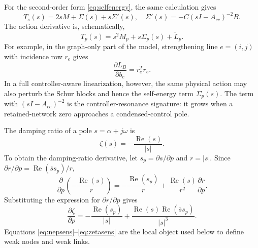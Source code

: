 \documentclass[conference]{IEEEtran}
\newcommand{\Real}{\operatorname{Re}}
\begin{document}
For the second-order form \eqref{eq:selfenergy}, the same calculation gives
\begin{equation}
  T_s(s)=2sM+\Sigma(s)+s\Sigma'(s),\quad
  \Sigma'(s)=-C(sI-A_{cc})^{-2}B .
  \label{eq:ts}
\end{equation}
The action derivative is, schematically,
\begin{equation}
  T_p(s)=s^2M_p+s\Sigma_p(s)+\widetilde L_p .
  \label{eq:tp_general}
\end{equation}
For example, in the graph-only part of the model, strengthening line
$e=(i,j)$ with incidence row $r_e$ gives
\begin{equation}
  \frac{\partial L_B}{\partial b_e}=r_e^Tr_e .
  \label{eq:line_derivative_tutorial}
\end{equation}
In a full controller-aware linearization, however, the same physical action may
also perturb the Schur blocks and hence the self-energy term $\Sigma_p(s)$.
The term with $(sI-A_{cc})^{-2}$ is the controller-resonance signature: it grows when a retained-network zero approaches a condensed-control pole.

The damping ratio of a pole $s=\alpha+j\omega$ is
\begin{equation}
  \zeta(s)=-\frac{\Real(s)}{|s|}.
  \label{eq:zeta}
\end{equation}
To obtain the damping-ratio derivative, let $s_p=\partial s/\partial p$ and
$r=|s|$. Since $\partial r/\partial p=\Real(\overline{s}s_p)/r$,
\begin{equation}
  \frac{\partial}{\partial p}\left(-\frac{\Real(s)}{r}\right)
  =
  -\frac{\Real(s_p)}{r}
  +\frac{\Real(s)}{r^2}\frac{\partial r}{\partial p}.
  \label{eq:zeta_chain}
\end{equation}
Substituting the expression for $\partial r/\partial p$ gives
\begin{equation}
  \frac{\partial\zeta}{\partial p}
  =
  -\frac{\Real(s_p)}{|s|}
  +
  \frac{\Real(s)\Real(\overline{s}s_p)}{|s|^3}.
  \label{eq:zetasens}
\end{equation}
Equations \eqref{eq:nepsens}--\eqref{eq:zetasens} are the local object used below to define weak nodes and weak links.
\end{document}
